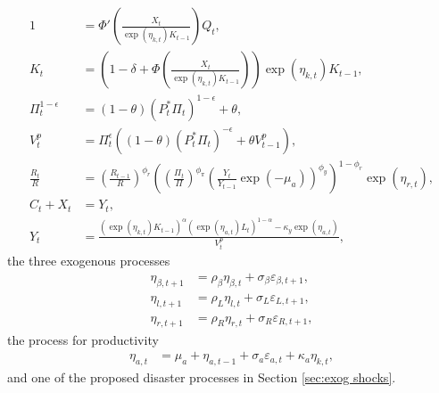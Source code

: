 \documentclass[12 pt, oneside]{article}
\theoremstyle{definition}
\theoremstyle{definition}
\theoremstyle{definition}
\begin{document}
\begin{align}
  \label{eq:tobins q eqm}
  1 & = \Phi'\left(\frac{X_t}{\exp(\eta_{k, t})K_{t - 1}}\right) Q_t,\\
  \label{eq:law of motion capital eqm}
  K_t & = \left(1 - \delta + \Phi\left(\frac{X_t}{\exp(\eta_{k, t})K_{t - 1}}\right)\right)\exp(\eta_{k, t})K_{t - 1},\\
  \label{eq:inflation from optimal reset price eqm}
  \Pi_t^{ 1 - \epsilon} & = (1 - \theta) (P_t^*\Pi_t)^{1 - \epsilon} + \theta,\\
  \label{eq:price dispersion evol eqm}
  V_t^p & = \Pi_t^{\epsilon}((1 - \theta) (P_t^* \Pi_t)^{-\epsilon} + \theta V_{t - 1}^p),\\
  \label{eq:taylor rule eqm}
  \frac{R_t}{R} & =  \left(\frac{R_{t - 1}}{R}\right)^{\phi_r}\left(\left(\frac{\Pi_t}{\Pi}\right)^{\phi_\pi}\left(\frac{Y_t}{Y_{t - 1}}\exp(-\mu_a)\right)^{\phi_y}\right)^{1 - \phi_r}\exp(\eta_{r, t}),\\
  \label{eq:output market clearing eqm}
  C_t + X_t & = Y_t,\\
  \label{eq:aggregate supply eqm}
  Y_t & = \frac{(\exp(\eta_{k, t}) K_{t - 1})^{\alpha}(\exp(\eta_{a, t})L_t)^{1 - \alpha} - \kappa_y \exp(\eta_{a, t})}{V_t^p},
\end{align}
the three exogenous processes
\begin{align}
  \label{eq:ar1 beta}
  \eta_{\beta, t + 1} & = \rho_\beta\eta_{\beta, t} + \sigma_\beta \varepsilon_{\beta, t + 1},\\
  \eta_{l, t + 1} & = \rho_L\eta_{l, t} + \sigma_L \varepsilon_{L, t + 1},\\
  \label{eq:ar1 R}
  \eta_{r, t + 1} & = \rho_R\eta_{r, t} + \sigma_R \varepsilon_{R, t + 1},
\end{align}
the process for productivity
\begin{align}
  \label{eq:productivity process eqm}
  \eta_{a, t} & = \mu_a + \eta_{a, t - 1} + \sigma_a \varepsilon_{a, t} + \kappa_a\eta_{k, t},
\end{align}
and one of the proposed disaster processes in Section \ref{sec:exog shocks}.
\end{document}
